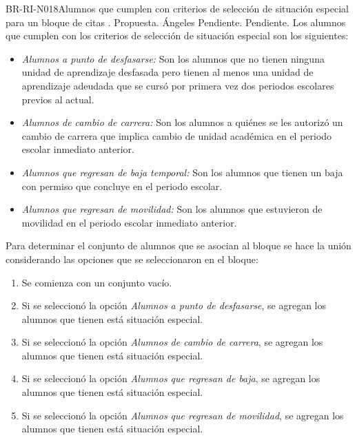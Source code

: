 \begin{BusinessRule}{BR-RI-N018}{Alumnos que cumplen con criterios de selección de situación especial para un bloque de citas}
	{\bcIntegridad}    %
	{\btEnabler}     %
	{\blControlling}    %
	.
	\BRItem[Estado] Propuesta.
	 Ángeles
	 Pendiente.
	 Pendiente.
	\BRItem[Descripción] Los alumnos que cumplen con los criterios de selección de situación especial son los siguientes:
		\begin{itemize}
			\item {\it Alumnos a punto de desfasarse:} Son los alumnos que no tienen ninguna unidad de aprendizaje desfasada pero tienen al menos una unidad de aprendizaje adeudada que se cursó por primera vez dos periodos escolares previos al actual.
			\item {\it Alumnos de cambio de carrera:} Son los alumnos a quiénes se les autorizó un cambio de carrera que implica cambio de unidad académica en el periodo escolar inmediato anterior.
			\item {\it Alumnos que regresan de baja temporal:} Son los alumnos que tienen un baja con permiso que concluye en el periodo escolar.
			\item {\it Alumnos que regresan de movilidad:} Son los alumnos que estuvieron de movilidad en el periodo escolar inmediato anterior.
		\end{itemize}
	
	Para determinar el conjunto de alumnos que se asocian al bloque se hace la unión considerando las opciones que se seleccionaron en el bloque:
		\begin{enumerate}
				\item Se comienza con un conjunto vacío.
				\item Si se seleccionó la opción {\it Alumnos a punto de desfasarse}, se agregan los alumnos que tienen está situación especial.
				\item Si se seleccionó la opción {\it Alumnos de cambio de carrera}, se agregan los alumnos que tienen está situación especial.				
				\item Si se seleccionó la opción {\it Alumnos que regresan de baja}, se agregan los alumnos que tienen está situación especial.				
				\item Si se seleccionó la opción {\it Alumnos que regresan de movilidad}, se agregan los alumnos que tienen está situación especial.			
		\end{enumerate}
	

\end{BusinessRule}
